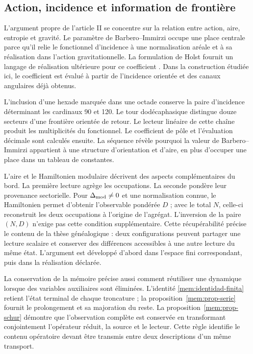 \subsection{Action, incidence et information de frontière}

L'argument propre de l'article II se concentre sur la relation entre
action, aire, entropie et gravité. Le paramètre de Barbero--Immirzi occupe
une place centrale parce qu'il relie le fonctionnel d'incidence à une
normalisation aréale et à sa réalisation dans l'action gravitationnelle.
La formulation de Holst fournit un langage de réalisation ultérieure
pour ce coefficient \cite{holst1996}. Dans la construction étudiée ici,
le coefficient est évalué à partir de l'incidence orientée et des canaux
angulaires déjà obtenus.

L'inclusion d'une hexade marquée dans une octade conserve la paire
d'incidence déterminant les cardinaux 90 et 120. Le tour dodécaphasique
distingue douze secteurs d'une frontière orientée de retour. Le lecteur
linéaire de cette chaîne produit les multiplicités du fonctionnel. Le
coefficient de pôle et l'évaluation décimale sont calculés ensuite.
La séquence révèle pourquoi la valeur de Barbero--Immirzi appartient à une
structure d'orientation et d'aire, en plus d'occuper une place dans
un tableau de constantes.

L'aire et le Hamiltonien modulaire décrivent des aspects complémentaires
du bord. La première lecture agrège les occupations. La seconde pondère
leur provenance sectorielle. Pour \(\Delta_{\rm mod}\ne0\) et une
normalisation connue, le Hamiltonien permet d'obtenir l'observable
pondérée \(D\) ; avec le total \(N\), celle-ci reconstruit les deux
occupations à l'origine de l'agrégat. L'inversion de la paire
\((N,D)\) n'exige pas cette condition supplémentaire. Cette récupérabilité précise
le contenu de la thèse généalogique : deux configurations peuvent
partager une lecture scalaire et conserver des différences accessibles à une autre
lecture du même état. L'argument est développé d'abord dans
l'espace fini correspondant, puis dans la réalisation déclarée.

La conservation de la mémoire précise aussi comment réutiliser une dynamique
lorsque des variables auxiliaires sont éliminées. L'identité
\eqref{mem:identidad-finita} retient l'état terminal de chaque troncature ;
la proposition~\ref{mem:prop-serie} fournit le prolongement et sa majoration
du reste. La proposition~\ref{mem:prop-schur} démontre que l'observation
complète est conservée en transformant conjointement l'opérateur réduit,
la source et le lecteur. Cette règle identifie le contenu opératoire
devant être transmis entre deux descriptions d'un même transport.

